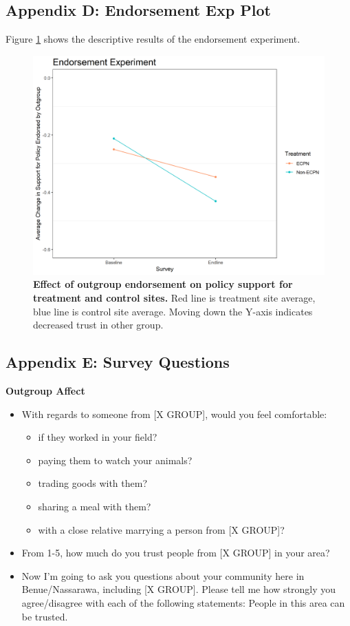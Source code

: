 \documentclass[11pt]{article}
\providecommand{\tightlist}{%
  \setlength{\itemsep}{0pt}\setlength{\parskip}{0pt}}
\begin{document}
\hypertarget{appendix-d-endorsement-exp-plot}{%
\subsection{Appendix D: Endorsement Exp
Plot}\label{appendix-d-endorsement-exp-plot}}

Figure \ref{fig:end1} shows the descriptive results of the endorsement
experiment.

\begin{figure}[H]
\centering
\includegraphics[width=.7\textwidth]{../../../figs/endComm_plot.png}
\caption{\label{fig:end1} \textbf{Effect of outgroup endorsement on policy support for treatment and control sites.} Red line is treatment site average, blue line is control site average.  Moving down the Y-axis indicates decreased trust in other group.}
\end{figure}

\hypertarget{appendix-e-survey-questions}{%
\subsection{Appendix E: Survey
Questions}\label{appendix-e-survey-questions}}

\textbf{Outgroup Affect}

\begin{itemize}
\tightlist
\item
  With regards to someone from {[}X GROUP{]}, would you feel
  comfortable:

  \begin{itemize}
  \tightlist
  \item
    if they worked in your field?
  \item
    paying them to watch your animals?
  \item
    trading goods with them?
  \item
    sharing a meal with them?
  \item
    with a close relative marrying a person from {[}X GROUP{]}?
  \end{itemize}
\item
  From 1-5, how much do you trust people from {[}X GROUP{]} in your
  area?
\item
  Now I'm going to ask you questions about your community here in
  Benue/Nassarawa, including {[}X GROUP{]}. Please tell me how strongly
  you agree/disagree with each of the following statements: People in
  this area can be trusted.
\end{itemize}
\end{document}
